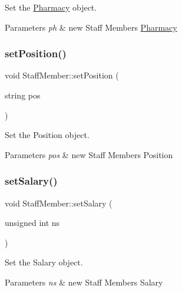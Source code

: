 Set the \hyperlink{classPharmacy}{Pharmacy} object. 


\begin{DoxyParams}{Parameters}
{\em ph} & new Staff Member\textquotesingle{}s \hyperlink{classPharmacy}{Pharmacy} \\
\hline
\end{DoxyParams}
\mbox{\label{classStaffMember_afa7f9171f01d6d24ea25e0e458fca513}} 
\subsubsection{\texorpdfstring{set\+Position()}{setPosition()}}
{\footnotesize\ttfamily void Staff\+Member\+::set\+Position (\begin{DoxyParamCaption}\item[{string}]{pos }\end{DoxyParamCaption})}



Set the Position object. 


\begin{DoxyParams}{Parameters}
{\em pos} & new Staff Member\textquotesingle{}s Position \\
\hline
\end{DoxyParams}
\mbox{\label{classStaffMember_ab2d7ec284f4c34d7951b3168106bf092}} 
\subsubsection{\texorpdfstring{set\+Salary()}{setSalary()}}
{\footnotesize\ttfamily void Staff\+Member\+::set\+Salary (\begin{DoxyParamCaption}\item[{unsigned int}]{ns }\end{DoxyParamCaption})}



Set the Salary object. 


\begin{DoxyParams}{Parameters}
{\em ns} & new Staff Member\textquotesingle{}s Salary \\
\hline
\end{DoxyParams}


